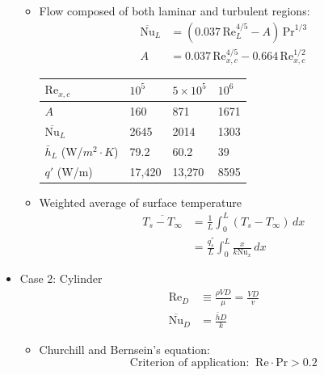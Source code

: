 \begin{itemize}
\begin{itemize}
        \item Flow composed of both laminar and turbulent regions:
        \begin{align*}
            \overline{\text{Nu}}_L &= \left(0.037\, \text{Re}_{L}^{4/5}-A\right)\, \text{Pr}^{1/3} \\
            A &= 0.037 \, \text{Re}^{4/5}_{x,c} - 0.664 \, \text{Re}^{1/2}_{x,c} 
        \end{align*}
        \begin{table}[H]
            \centering
            \begin{tabular}{|l|l|l|l|}
            \hline
            \textbf{$\text{Re}_{x,c}$}   & \textbf{$10^5$} & \textbf{$5\times 10^5$} & \textbf{$10^6$} \\ \hline
            $A$                          & 160             & 871                     & 1671            \\ \hline
            $\overline{\text{Nu}}_L$     & 2645            & 2014                    & 1303            \\ \hline
            $\bar{h}_L$ (W/$m^2\cdot K$) & 79.2            & 60.2                    & 39              \\ \hline
            $q'$ (W/m)                   & 17,420          & 13,270                  & 8595            \\ \hline
            \end{tabular}
        \end{table}
        \item Weighted average of surface temperature
        \begin{align*}
            \overline{T_s - T_{\infty}} &= \frac{1}{L} \int_{0}^{L} \left(T_s - T_{\infty}\right)\, dx \\
            &= \frac{q^{''}_{s}}{L} \int_{0}^{L} \frac{x}{k \text{Nu}_x} \, dx
        \end{align*}
    \end{itemize}
    \item Case 2: \color{red} Cylinder \color{black}
    \begin{align*}
        \text{Re}_D &\equiv \frac{\rho V D}{\mu} = \frac{VD}{v} \\
        \overline{\text{Nu}}_D &= \frac{\bar{h}D}{k}
    \end{align*}
    \begin{itemize}
        \item Churchill and Bernsein's equation:
        \begin{equation*}
            \text{Criterion of application:}\;\;\text{Re}\cdot \text{Pr} > 0.2
        \end{equation*}
    \end{itemize}
\end{itemize}
